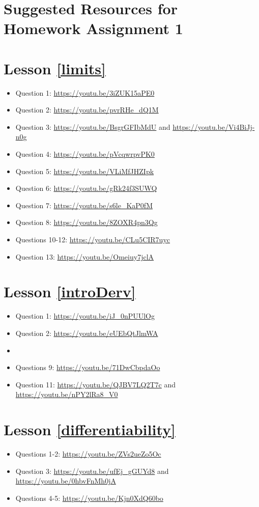 \section*{Suggested Resources for Homework Assignment 1}
\section*{Lesson \ref{limits}}
\begin{itemize}[leftmargin=*]
    \item Question 1: \url{https://youtu.be/3iZUK15aPE0}
    \item Question 2: \url{https://youtu.be/pvrRHe_dQ1M}
    \item Question 3: \url{https://youtu.be/BsgrGFIbMdU} and \url{https://youtu.be/Vi4BiJj-n0g}
    \item Question 4: \url{https://youtu.be/pVcqwrpvPK0}
    \item Question 5: \url{https://youtu.be/VLiMfJHZIpk}
    \item Question 6: \url{https://youtu.be/gRk24f3SUWQ}
    \item Question 7: \url{https://youtu.be/s6le_KaP0fM}
    \item Question 8: \url{https://youtu.be/8ZOXR4pn3Qg}
    \item Questions 10-12: \url{https://youtu.be/CLu5CIR7uyc}
    \item Question 13: \url{https://youtu.be/Omeiuy7jclA}
\end{itemize}

\section*{Lesson \ref{introDerv}}
\begin{itemize}[leftmargin=*]
    \item Question 1: \url{https://youtu.be/iJ_0nPUUlOg}
    \item Question 2: \url{https://youtu.be/eUEbQtJlmWA}
    \item {}
    \item Questions 9: \url{https://youtu.be/71DwCbpdaOo}
    \item Question 11: \url{https://youtu.be/QJBV7LQ2T7c} and \url{https://youtu.be/nPY2lRa8_V0}
\end{itemize}

\section*{Lesson \ref{differentiability}}
\begin{itemize}[leftmargin=*]
    \item Questions 1-2: \url{https://youtu.be/ZVs2ueZo5Oc}
    \item Question 3: \url{https://youtu.be/ufEj_gGUYd8} and \url{https://youtu.be/0hbvFnMh0jA}
    \item Questions 4-5: \url{https://youtu.be/Kjn0XdQ60bo}
\end{itemize}


